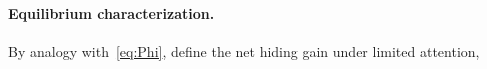 \paragraph{Equilibrium characterization.}
By analogy with~\eqref{eq:Phi}, define the net hiding gain under limited attention,
